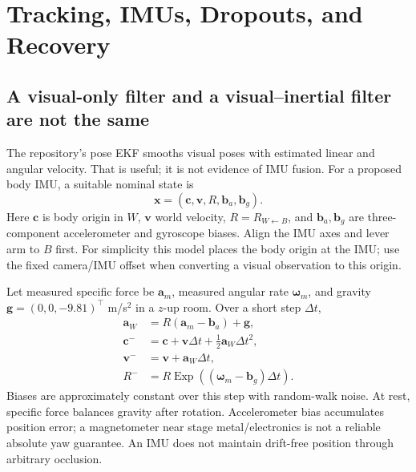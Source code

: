 \documentclass[11pt,a4paper]{article}
\newcommand{\Rot}[2]{R_{#1\leftarrow #2}}
\DeclareMathOperator{\Exp}{Exp}
\begin{document}
\section{Tracking, IMUs, Dropouts, and Recovery}
\label{sec:tracking}

\subsection{A visual-only filter and a visual--inertial filter are not the same}
The repository's pose EKF smooths visual poses with estimated linear and
angular velocity. That is useful; it is not evidence of IMU fusion.
For a proposed body IMU, a suitable nominal state is
\begin{equation}
\bm{x}=(\bm{c},\bm{v},R,\bm{b}_a,\bm{b}_g).
\end{equation}
Here $\bm{c}$ is body origin in $W$, $\bm{v}$ world velocity,
$R=\Rot{W}{B}$, and $\bm{b}_a,\bm{b}_g$ are three-component accelerometer
and gyroscope biases. Align the IMU axes and lever arm to $B$ first.
For simplicity this model places the body origin at the IMU; use the fixed
camera/IMU offset when converting a visual observation to this origin.

Let measured specific force be $\bm{a}_m$, measured angular rate
$\bm{\omega}_m$, and gravity $\bm{g}=(0,0,-9.81)^\top$ m/s$^2$ in a
$z$-up room. Over a short step $\Delta t$,
\begin{align}
\bm{a}_W&=R(\bm{a}_m-\bm{b}_a)+\bm{g},\\
\bm{c}^-&=\bm{c}+\bm{v}\Delta t+\tfrac12\bm{a}_W\Delta t^2,\\
\bm{v}^-&=\bm{v}+\bm{a}_W\Delta t,\\
R^-&=R\Exp((\bm{\omega}_m-\bm{b}_g)\Delta t).
\label{eq:imu}
\end{align}
Biases are approximately constant over this step with random-walk noise.
At rest, specific force balances gravity after rotation.
Accelerometer bias accumulates position error; a magnetometer near stage
metal/electronics is not a reliable absolute yaw guarantee.
An IMU does not maintain drift-free position through arbitrary occlusion.
\end{document}
